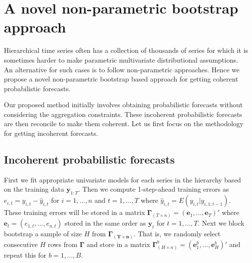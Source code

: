 \documentclass[12pt]{article}
\theoremstyle{definition}
\begin{document}


\section{A novel non-parametric bootstrap approach}\label{sec:non-para}

Hierarchical time series often has a collection of thousands of series for which it is sometimes harder to make parametric multivariate distributional assumptions. An alternative for such cases is to follow non-parametric approaches. Hence we propose a novel non-parametric bootstrap based approach for getting coherent probabilistic forecasts. 

Our proposed method initially involves obtaining probabilistic forecasts without considering the aggregation constraints. These incoherent probabilistic forecasts are then reconcile to make them coherent. Let us first focus on the methodology for getting incoherent forecasts.    

\subsection{Incoherent probabilistic forecasts} \label{Subsec:Incoherent_samplePaths}
First we fit appropriate univariate models for each series in the hierarchy based on the training data $\bm{y}_{1:T}$. Then we compute 1-step-ahead training errors as $e_{i,t} = y_{i,t} - \hat{y}_{i,t}$ for $i=1,...,n$ and $t = 1,...,T$ where $\hat{y}_{i,t} = E(y_{i,t}|y_{i,1:t-1})$. These training errors will be stored in a matrix $\bm{\Gamma}_{(T \times n)} = (\bm{e}_1,...,\bm{e}_T)'$ where $\bm{e}_t = (e_{1,t},...,e_{n,t})$ stored in the same order as $\bm{y}_t$ for $t=1,...,T$. Next we block bootstrap a sample of size $H$ from $\bm{\Gamma_{(T \times n)}}$. That is, we randomly select consecutive $H$ rows from $\bm{\Gamma}$ and store in a matrix $\bm{\Gamma}^b_{(H \times n)} = (\bm{e}^b_1,...,\bm{e}^b_H)'$ and repeat this for $b = 1,...,B$.  
\end{document}
